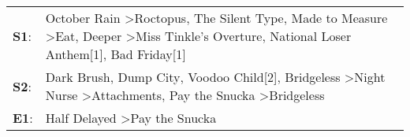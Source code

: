 \begin{supertabular}{p{0.03\textwidth}p{0.92\textwidth}}
 \textbf{S1}:  &  October Rain\textsuperscript{} \textgreater \enspace Roctopus\textsuperscript{}, \enspace The Silent Type\textsuperscript{}, \enspace Made to Measure\textsuperscript{} \textgreater \enspace Eat\textsuperscript{}, \enspace Deeper\textsuperscript{} \textgreater \enspace Miss Tinkle's Overture\textsuperscript{}, \enspace National Loser Anthem[1]\textsuperscript{}, \enspace Bad Friday[1]\textsuperscript{}  \enspace  \\
 \textbf{S2}:  &                                                           Dark Brush\textsuperscript{}, \enspace Dump City\textsuperscript{}, \enspace Voodoo Child[2]\textsuperscript{}, \enspace Bridgeless\textsuperscript{} \textgreater \enspace Night Nurse\textsuperscript{} \textgreater \enspace Attachments\textsuperscript{}, \enspace Pay the Snucka\textsuperscript{} \textgreater \enspace Bridgeless\textsuperscript{}  \enspace  \\
 \textbf{E1}:  &                                                                                                                                                                                                                                                                                                                                 Half Delayed\textsuperscript{} \textgreater \enspace Pay the Snucka\textsuperscript{}  \enspace  \\
\end{supertabular}
